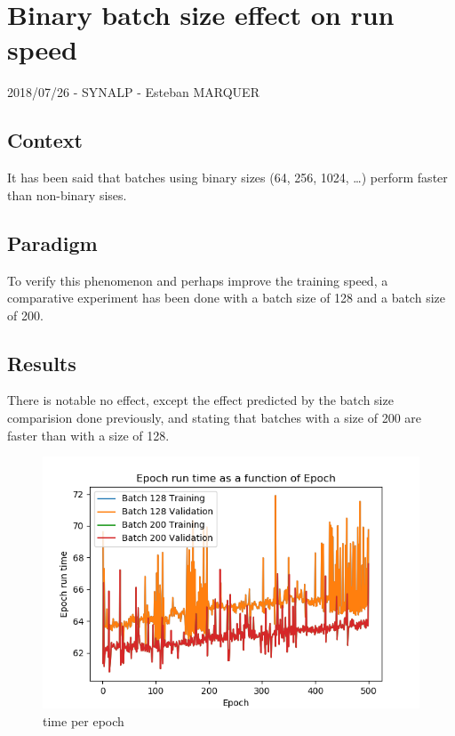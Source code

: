\section*{Binary batch size effect on run
speed}

2018/07/26 - SYNALP - Esteban MARQUER

\subsection{Context}

It has been said that batches using binary sizes (64, 256, 1024,
\ldots{}) perform faster than non-binary sises.

\subsection{Paradigm}

To verify this phenomenon and perhaps improve the training speed, a
comparative experiment has been done with a batch size of 128 and a
batch size of 200.

\subsection{Results}

There is notable no effect, except the effect predicted by the batch
size comparision done previously, and stating that batches with a size
of 200 are faster than with a size of 128.

\begin{figure}[ht]
\centering
\includegraphics{parts/appendix/reports-papud/2018_07_26-Binary_batch_size/time_epoch.png}
\caption{time per epoch}
\end{figure}

